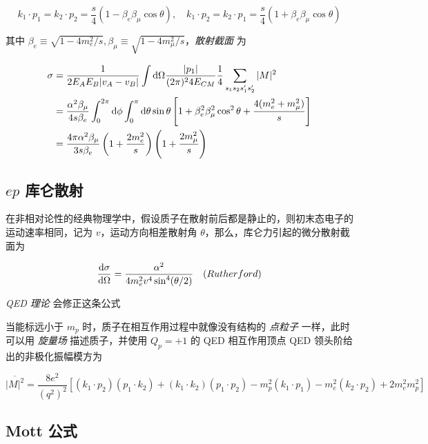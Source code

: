 \begin{equation}
    k_1 \cdot p_1 = k_2 \cdot p_2 = \frac{s}{4} (1 - \beta_e \beta_\mu \cos\theta), \quad k_1 \cdot p_2 = k_2 \cdot p_1 = \frac{s}{4} (1 + \beta_e \beta_\mu \cos\theta)
\end{equation}

其中 $\beta_e \equiv \sqrt{1-4 m_e^2/s}, \beta_\mu \equiv \sqrt{1-4 m_\mu^2/s}$，\emph{散射截面} 为

\begin{align}
    \sigma &= \frac{1}{2 E_A E_B |v_A - v_B|} \int \mathop{}\!\mathrm{d}\Omega \frac{|p_1|}{(2\pi)^2 4 E_{CM}} \frac{1}{4} \sum_{s_1 s_2 s_1^\prime s_2^\prime} |M|^2 \\
    &= \frac{\alpha^2 \beta_\mu}{4s\beta_e} \int_0^{2\pi} \mathop{}\!\mathrm{d}\phi \int_0^{\pi} \mathop{}\!\mathrm{d}\theta \sin\theta \left[1+\beta_e^2 \beta_\mu^2 \cos^2 \theta + \frac{4(m^2_e+m^2_\mu)}{s}\right] \\
    &= \frac{4\pi \alpha^2 \beta_\mu}{3s\beta_e} \left(1+\frac{2 m^2_e}{s}\right) \left(1+\frac{2 m^2_\mu}{s}\right)
\end{align}

\subsection{\texorpdfstring{$ep$}{ep} 库仑散射}

在非相对论性的经典物理学中，假设质子在散射前后都是静止的，则初末态电子的运动速率相同，记为 $v$，运动方向相差散射角 $\theta$，那么，库仑力引起的微分散射截面为

\begin{equation}
    \frac{\mathop{}\!\mathrm{d}\sigma}{\mathop{}\!\mathrm{d}\Omega} = \frac{\alpha^2}{4 m_e^2 v^4 \sin^4(\theta/2)} \quad (Rutherford)
\end{equation}

\emph{QED 理论} 会修正这条公式

当能标远小于 $m_p$ 时，质子在相互作用过程中就像没有结构的 \emph{点粒子} 一样，此时可以用 \emph{旋量场} 描述质子，并使用 $Q_p=+1$ 的 QED 相互作用顶点 QED 领头阶给出的非极化振幅模方为

\begin{equation}
    \overline{|M|^2} = \frac{8 e^2}{(q^2)^2} \left[(k_1 \cdot p_2) (p_1 \cdot k_2) + (k_1 \cdot k_2) (p_1 \cdot p_2) - m_p^2 (k_1 \cdot p_1) - m_e^2 (k_2 \cdot p_2) + 2 m_e^2 m_p^2\right]
\end{equation}

\subsection{Mott 公式}

